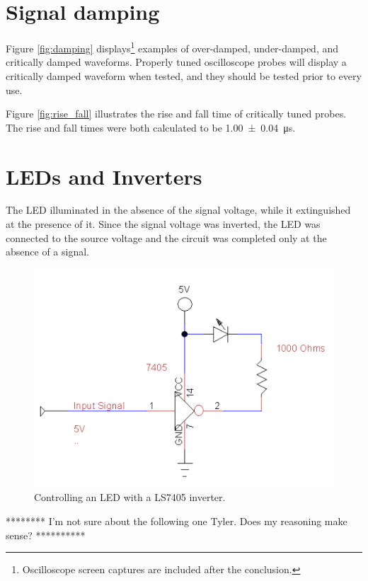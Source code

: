 \documentclass[11pt]{article}
\begin{document}
\section{Signal damping}

Figure \ref{fig:damping} displays\footnote{Oscilloscope screen captures are included after the conclusion.} examples of over-damped, under-damped, and critically damped waveforms. Properly tuned oscilloscope probes will display a critically damped waveform when tested, and they should be tested prior to every use.

Figure \ref{fig:rise_fall} illustrates the rise and fall time of critically tuned probes.  The rise and fall times were both calculated to be \SI{1.00 +- 0.04}{\micro\second}.

\section{LEDs and Inverters}

The LED illuminated in the absence of the signal voltage, while it extinguished at the presence of it. Since the signal voltage was inverted, the LED was connected to the source voltage and the circuit was completed only at the absence of a signal.

\begin{figure}[h]
	\centering
	\includegraphics[scale=0.6, draft=false]{inverter}
	\caption{Controlling an LED with a LS7405 inverter.}
	\label{fig:inverter}
\end{figure}

******** I'm not sure about the following one Tyler. Does my reasoning make sense? **********
\end{document}
